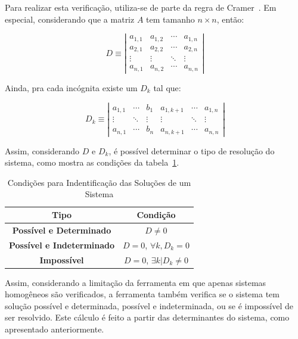 \documentclass[a4paper,10pt]{report}
\begin{document}
Para realizar esta verificação, utiliza-se de parte da regra de Cramer~\cite{cramer}. Em especial, considerando que a matriz $A$ tem tamanho $n \times n$, então:

\[
D \equiv \left| \begin{array}{cccc}
a_{1,1} & a_{1,2} & \cdots & a_{1,n} \\
a_{2,1} & a_{2,2} & \cdots & a_{2,n} \\
\vdots  & \vdots & \ddots & \vdots \\
a_{n,1} & a_{n,2} & \cdots & a_{n,n}
\label{arr:detcoeficientes}
\end{array}\right|
\]

Ainda, pra cada incógnita existe um $D_{k}$ tal que:

\[
D_{k} \equiv \left| \begin{array}{ccccccc}
a_{1,1} & \cdots & b_{1} & a_{1,k+1} & \cdots & a_{1,n}\\
\vdots  & \ddots & \vdots & \vdots  & \ddots & \vdots \\
a_{n,1} & \cdots & b_{n} & a_{n,k+1} & \cdots & a_{n,n}
\label{arr:detcoeficientesk}
\end{array}\right|
\]

Assim, considerando $D$ e $D_{k}$, é possível determinar o tipo de resolução do sistema, como mostra as condições da tabela~\ref{tab:sistemad}.

\begin{table}[h]
\centering
\caption{Condições para Indentificação das Soluções de um Sistema}
        \begin{tabular}{|c|c|}
        \hline
        \textbf{Tipo} & \textbf{Condição} \\ \hline
        \textbf{Possível e Determinado} & $D \neq 0$ \\ \hline
        \textbf{Possível e Indeterminado} & $D = 0$, $\forall k, D_{k} = 0$ \\ \hline
        \textbf{Impossível} & $D = 0$, $\exists k | D_{k} \neq 0$ \\ \hline
        \end{tabular}
\label{tab:sistemad}
\end{table} 

Assim, considerando a limitação da ferramenta em que apenas sistemas homogêneos são verificados, a ferramenta também verifica se o sistema tem solução possível e determinada, possível e indeterminada, ou se é impossível de ser resolvido. Este cálculo é feito a partir das determinantes do sistema, como apresentado anteriormente.
\end{document}

